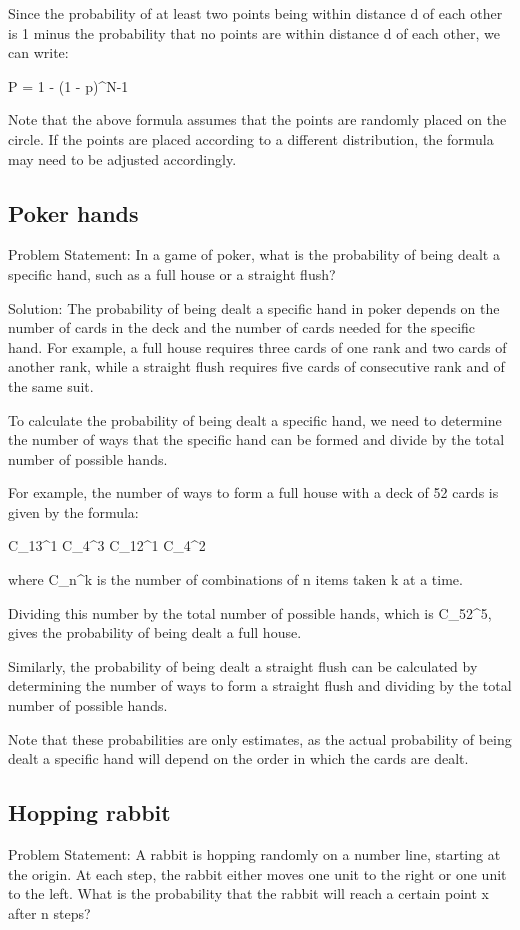 \documentclass[12pt, a4paper, oneside]{article}
\begin{document}
Since the probability of at least two points being within distance d of each other is 1 minus the probability that no points are within distance d of each other, we can write:

P = 1 - (1 - p)^{N-1}

Note that the above formula assumes that the points are randomly placed on the circle. If the points are placed according to a different distribution, the formula may need to be adjusted accordingly.
\subsection{ Poker hands }
Problem Statement:
In a game of poker, what is the probability of being dealt a specific hand, such as a full house or a straight flush?

Solution:
The probability of being dealt a specific hand in poker depends on the number of cards in the deck and the number of cards needed for the specific hand. For example, a full house requires three cards of one rank and two cards of another rank, while a straight flush requires five cards of consecutive rank and of the same suit.

To calculate the probability of being dealt a specific hand, we need to determine the number of ways that the specific hand can be formed and divide by the total number of possible hands.

For example, the number of ways to form a full house with a deck of 52 cards is given by the formula:

C_{13}^{1} \cdot C_{4}^{3} \cdot C_{12}^{1} \cdot C_{4}^{2}

where C_{n}^{k} is the number of combinations of n items taken k at a time.

Dividing this number by the total number of possible hands, which is C_{52}^{5}, gives the probability of being dealt a full house.

Similarly, the probability of being dealt a straight flush can be calculated by determining the number of ways to form a straight flush and dividing by the total number of possible hands.

Note that these probabilities are only estimates, as the actual probability of being dealt a specific hand will depend on the order in which the cards are dealt.
\subsection{ Hopping rabbit }
Problem Statement:
A rabbit is hopping randomly on a number line, starting at the origin. At each step, the rabbit either moves one unit to the right or one unit to the left. What is the probability that the rabbit will reach a certain point x after n steps?
\end{document}
